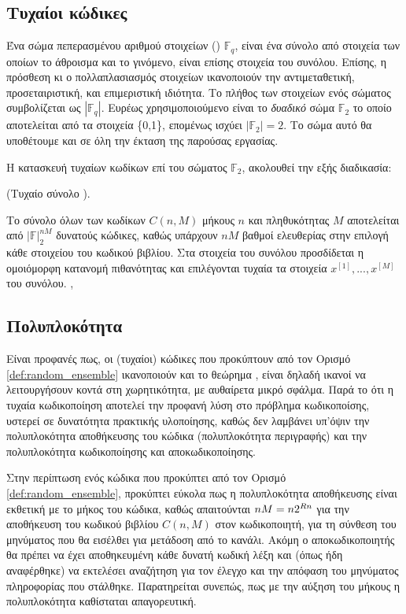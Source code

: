 \subsection{Τυχαίοι κώδικες}
\en{\lipsum[1]}



Ένα σώμα πεπερασμένου αριθμού στοιχείων () $\mathbb{F}_q$, είναι ένα σύνολο από στοιχεία των οποίων το άθροισμα και το γινόμενο, είναι επίσης στοιχεία του συνόλου. Επίσης, η πρόσθεση κι ο πολλαπλασιασμός στοιχείων ικανοποιούν την αντιμεταθετική, προσεταιριστική, και επιμεριστική ιδιότητα. Tο πλήθος των στοιχείων ενός σώματος συμβολίζεται ως $|\mathbb{F}_q|$. Ευρέως χρησιμοποιούμενο είναι το \textit{δυαδικό} σώμα $\mathbb{F}_2$ το οποίο αποτελείται από τα στοιχεία \{0,1\}, επομένως ισχύει $|\mathbb{F}_2|=2$. Το σώμα αυτό θα υποθέτουμε και σε όλη την έκταση της παρούσας εργασίας.

Η κατασκευή τυχαίων κωδίκων επί του σώματος $\mathbb{F}_2$, ακολουθεί την εξής διαδικασία:
\begin{definition}{(Τυχαίο σύνολο ).}

Το σύνολο όλων των κωδίκων $C(n,M)$ μήκους $n$ και πληθυκότητας $M$ αποτελείται από $|\mathbb{F}|_2^{nM}$ δυνατούς κώδικες, καθώς υπάρχουν $nM$ βαθμοί ελευθερίας στην επιλογή κάθε στοιχείου του κωδικού βιβλίου. Στα στοιχεία του συνόλου προσδίδεται η ομοιόμορφη κατανομή πιθανότητας και επιλέγονται τυχαία τα στοιχεία $x^{[1]},...,x^{[M]}$ του συνόλου. \cite{richardson2008modern},\cite{shannon1948mathematical}
\label{def:random_ensemble}
\end{definition}

\en{\lipsum[1]}
\subsection{Πολυπλοκότητα}
Είναι προφανές πως, οι (τυχαίοι) κώδικες που προκύπτουν από τον Ορισμό \ref{def:random_ensemble} ικανοποιούν και το θεώρημα , είναι δηλαδή ικανοί να λειτουργήσουν κοντά στη χωρητικότητα, με αυθαίρετα μικρό σφάλμα. Παρά το ότι η τυχαία κωδικοποίηση αποτελεί την προφανή λύση στο πρόβλημα κωδικοποίσης, υστερεί σε δυνατότητα πρακτικής υλοποίησης, καθώς δεν λαμβάνει υπ'όψιν την πολυπλοκότητα αποθήκευσης του κώδικα (πολυπλοκότητα περιγραφής) και την πολυπλοκότητα κωδικοποίησης και αποκωδικοποίησης.

Στην περίπτωση ενός κώδικα που προκύπτει από τον Ορισμό \ref{def:random_ensemble}, προκύπτει εύκολα πως η πολυπλοκότητα αποθήκευσης είναι εκθετική με το μήκος του κώδικα, καθώς απαιτούνται $nM = n\*2^{Rn}$  για την αποθήκευση του κωδικού βιβλίου $C(n,M)$ στον κωδικοποιητή, για τη σύνθεση του μηνύματος που θα εισέλθει για μετάδοση από το κανάλι. Ακόμη ο αποκωδικοποιητής θα πρέπει να έχει αποθηκευμένη κάθε δυνατή κωδική λέξη και (όπως ήδη αναφέρθηκε) να εκτελέσει αναζήτηση για τον έλεγχο και την απόφαση του μηνύματος πληροφορίας που στάλθηκε. Παρατηρείται συνεπώς, πως με την αύξηση του μήκους  η πολυπλοκότητα καθίσταται απαγορευτική. 

